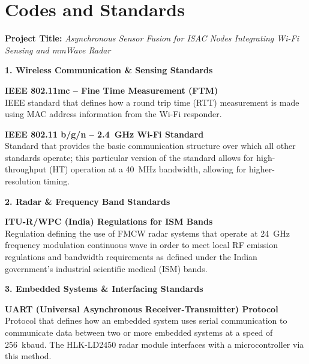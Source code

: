 {}
\chapter*{Codes and Standards}
\thispagestyle{plain}

\noindent\textbf{Project Title:} \textit{Asynchronous Sensor Fusion for ISAC Nodes Integrating Wi-Fi Sensing and mmWave Radar}

\vspace{0.8cm}

\noindent\textbf{1. Wireless Communication \& Sensing Standards}

\medskip
\noindent\textbf{IEEE 802.11mc -- Fine Time Measurement (FTM)}\\
IEEE standard that defines how a round trip time (RTT) measurement is made using MAC address information from the Wi-Fi responder.

\medskip
\noindent\textbf{IEEE 802.11 b/g/n -- 2.4~GHz Wi-Fi Standard}\\
Standard that provides the basic communication structure over which all other standards operate; this particular version of the standard allows for high-throughput (HT) operation at a 40~MHz bandwidth, allowing for higher-resolution timing.

\vspace{0.6cm}
\noindent\textbf{2. Radar \& Frequency Band Standards}

\medskip
\noindent\textbf{ITU-R/WPC (India) Regulations for ISM Bands}\\
Regulation defining the use of FMCW radar systems that operate at 24~GHz frequency modulation continuous wave in order to meet local RF emission regulations and bandwidth requirements as defined under the Indian government's industrial scientific medical (ISM) bands.

\vspace{0.6cm}
\noindent\textbf{3. Embedded Systems \& Interfacing Standards}

\medskip
\noindent\textbf{UART (Universal Asynchronous Receiver-Transmitter) Protocol}\\
Protocol that defines how an embedded system uses serial communication to communicate data between two or more embedded systems at a speed of 256~kbaud. The HLK-LD2450 radar module interfaces with a microcontroller via this method.

